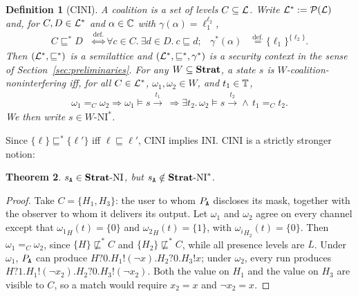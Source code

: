 \documentclass[preprint,5p,twocolumn]{elsarticle}
\newtheorem{theorem}{Theorem}
\newtheorem{definition}[theorem]{Definition}
\begin{document}
\begin{definition}[CINI]
  \label{def:coalition}
  A \emph{coalition} is a set of levels $C \subseteq \mathcal{L}$.
  Write $\mathcal{L}^* := \mathcal{P}(\mathcal{L})$ and, for $C, D \in \mathcal{L}^*$
  and $\alpha \in \mathbb{C}$ with $\gamma(\alpha) = \ell_1^{\ell_2}$,
  \begin{align*}
    C \sqsubseteq^* D &\overset{\mathrm{def.}}{\Longleftrightarrow} \forall c \in C.~\exists d \in D.~c \sqsubseteq d; &
    \gamma^*(\alpha) &\overset{\mathrm{def.}}{=} \{\ell_1\}^{\{\ell_2\}}.
  \end{align*}
  Then $(\mathcal{L}^*, \sqsubseteq^*)$ is a semilattice
  and $(\mathcal{L}^*, \sqsubseteq^*, \gamma^*)$ is a security context
  in the sense of Section~\ref{sec:preliminaries}.
  For any $W \subseteq \mathbf{Strat}$, a state $s$ is \emph{$W$-coalition-noninterfering} iff, for
  all $C \in \mathcal{L}^*$, $\omega_1,\omega_2 \in W$, and $t_1 \in \mathbb{T}$,
  \begin{align*}
    \omega_1 =_C \omega_2 \Longrightarrow \omega_1 \models s \xrightarrow{t_1}\,\Longrightarrow
    \exists t_2.\,\omega_2 \models s \xrightarrow{t_2} \land\, t_1 =_C t_2.
  \end{align*}
  We then write $s \in W\text{-NI}^*$.
\end{definition}

Since $\{\ell\} \sqsubseteq^* \{\ell'\}$ iff $\ell \sqsubseteq \ell'$, CINI implies INI.
CINI is a strictly stronger notion:

\begin{theorem}
  \label{thm:coalition rejects}
  $s_{\mathtt{A}} \in \mathbf{Strat}\text{-}\mathrm{NI}$, but $s_{\mathtt{A}} \notin \mathbf{Strat}\text{-}\mathrm{NI}^*$.
\end{theorem}
\begin{proof}
  Take $C = \{H_1, H_3\}$: the user to whom $P_{\mathtt{A}}$ discloses its mask, together with the observer to
  whom it delivers its output. Let $\omega_1$ and $\omega_2$ agree on every channel except that
  ${\omega_1}_H(t) = \{0\}$ and ${\omega_2}_H(t) = \{1\}$, with ${\omega_i}_{H_2}(t) = \{0\}$. Then
  $\omega_1 =_C \omega_2$, since $\{H\} \not\sqsubseteq^* C$ and $\{H_2\} \not\sqsubseteq^* C$,
  while all presence levels are $L$. Under $\omega_1$, $P_{\mathtt{A}}$ can produce
  $H?0.H_1!(\neg x).H_2?0.H_3!x$; under $\omega_2$, every run produces
  $H?1.H_1!(\neg x_2).H_2?0.H_3!(\neg x_2)$. Both the value on $H_1$ and the value on $H_3$ are
  visible to $C$, so a match would require $x_2 = x$ and $\neg x_2 = x$.
\end{proof}
\end{document}
